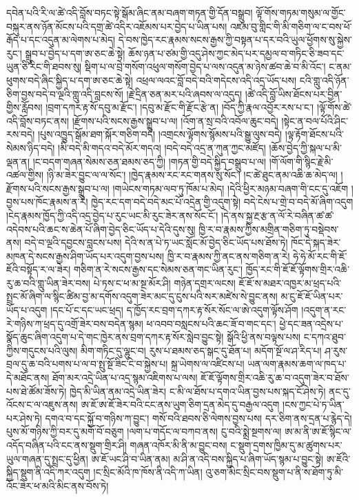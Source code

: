 \documentclass{article}
\begin{document}
དབེན་པའི་རི་ལ་ཚེ་འདི་བློས་བཏང་སྟེ་སྒོམ་ཞིང་ནམ་བཞག་གཏན་གྱི་དོན་བསྒྲུབ། ལྟོ་གོས་གཏམ་གསུམ་ལ་གྱོང་བསྐུར་ནས་ཉོན་མོངས་པའི་དགྲ་ཚེ་འདིར་འཇོམས་པར་བྱེད་པ་ཡིན་པས། འཛམ་བུ་གླིང་གི་མི་གཅིག་ལ་ང་བས་ཕོ་རྒོད་པ་དང་འདུན་མ་ལེགས་པ་མེད། དེ་བས་ཁྱེད་རང་རྣམས་སངས་རྒྱས་ཀྱི་བསྟན་པ་དར་བའི་ཡུལ་ཕྱོགས་སུ་སྐྱེས་རུང་། སྒྲུབ་པ་བྱེད་པ་དག་ཨ་ཅང་ཆེ་སྟེ། ཆོས་ཉན་པ་ཙམ་གྱི་འདུ་ཤེས་ཀྱང་མེད་པར་དམྱལ་བ་གཏིང་ཅི་ཟབ་དང་ཡུན་ཅི་རིང་གི་ཐབས་སུ། སྡིག་པ་ལ་བྲེ་གསོག་འཕུལ་གསོག་བྱེད་པ་ལས་འདུན་མ་ཉེས་ཚབ་ཆེ་བ་མི་འོང་། ང་ནམ་ཕུགས་བདེ་ཞིང་སྐྱིད་པ་དག་ཨ་ཅང་ཆེ་སྟེ། འཕྲལ་ལའང་བློ་བདེ་བའི་གདེངས་འདི་འདྲ་ཡོད་པས། ངའི་གླུ་འདི་ཉོན་ཅིག་བྱས་བདེ་བ་ལྔའི་གླུ་འདི་བླངས་སོ། །རྗེ་དྲིན་ཅན་མར་པའི་ཞབས་ལ་འདུད། །ཚེ་འདི་བློ་ཡིས་ཐོངས་པར་བྱིན་གྱིས་རློབས། །བྲག་དཀར་རྟ་སོ་དབུ་མ་རྫོང་། །དབུ་མ་རྫོང་གི་རྫོང་རྩེ་ན། །བོད་ཀྱི་རྣལ་འབྱོར་རས་པ་ང་། །ལྟོ་གོས་ཚེ་འདི་བློས་བཏང་ནས། །རྫོགས་པའི་སངས་རྒྱས་སྒྲུབ་པ་ལ། །འོག་ན་སྲ་བའི་འབོལ་ཆུང་བདེ། །སྟེང་ན་བལ་པོའི་ཤིང་རས་བདེ། །པུས་འཁྱུད་སྒོམ་ཐག་སྐོར་གཅིག་བདེ། །འགྲངས་ལྟོགས་སྙོམས་པའི་སྒྱུ་ལུས་བདེ། །ལྟ་རྟོག་ཐོངས་པའི་སེམས་ཉིད་བདེ། །མི་བདེ་མི་གདའ་བདེ་མོར་གདའ། །བདེ་བདེ་འདྲ་ན་ཀུན་ཀྱང་མཛོད། །ཆོས་བྱེད་ཀྱི་སྐལ་པ་མི་ལྡན་ན། །ང་བདག་གཞན་སེམས་ཅན་ཐམས་ཅད་ཀྱི། །གཏན་གྱི་བདེ་སྐྱིད་བསྒྲུབ་པ་ལ། །གོ་ལོག་གི་སྙིང་རྗེ་མི་འཚལ་གྱིས། །ཉི་མ་ཟེར་བྱུང་ལ་ལ་སོང་། །ཁྱེད་རྣམས་རང་རང་གནས་སུ་སོང་། །ང་ཚེ་ཐུང་ནམ་འཆི་ཆ་མེད་ལ། །རྫོགས་པའི་སངས་རྒྱས་སྒྲུབ་པ་ལ། །གཡེངས་གཏམ་ལབ་ཏུ་ཁོམ་པ་མེད། །དེའི་ཕྱིར་མཉམ་བཞག་གི་ངང་དུ་འཇོག །བྱས་པས་ཁོང་རྣམས་ན་རེ། ཁྱེད་རང་དག་བདེ་བདེ་མང་པོ་འདྲེན་གྱི་འདུག་སྟེ། བདེ་ངེས་པ་གྲེ་བ་བདེ་མོ་ཞིག་འདུག །ངེད་རྣམས་ཁྱོད་ཀྱི་འདི་འདྲ་བྱེད་པ་རུང་ཡང་མི་རུང་ཟེར་ནས་སོང་ངོ་། །དེ་ནས་སྐྱ་རྔ་རྩ་ན་ལོ་རེ་བཞིན་ཚ་ཚ་འདེབས་པའི་ཆང་ས་ཆེན་པོ་ཞིག་བྱེད་ཅིང་ཡོད་པ་དེའི་དུས་སུ། ཁྱི་ར་བ་རྣམས་ཀྱིས་མགྲིན་གཅིག་ཏུ་བསྡེབས་ནས། བདེ་བ་ལྔའི་དབྱངས་བླངས་པས། དེའི་ས་ན་པེ་ཏ་ཡང་སློང་མོ་བྱེད་ཅིང་ཡོད་པས་ཐོས་ཏེ། ཁོང་དེ་སྐད་ཟེར་མཁན་དེ་སངས་རྒྱས་ཤིག་ཡོད་པར་འདུག་བྱས་པས། ཁྱི་ར་བ་རྣམས་ཀྱི་ནང་ནས་གཅིག་ན་རེ། ཧེ་ཧེ་མོ་རང་གི་ཇོ་ཇོའི་བསྟོད་ར་ལ་ཟེར། གཅིག་ན་རེ་སངས་རྒྱས་དང་སེམས་ཅན་གང་ཡིན་རུང་། ཁྱོད་རང་གི་ཇོ་ཇོ་ལྟོགས་གྲིར་འཆི་རུ་ཆ་བའི་གླུ་ཡིན་ཟེར་བས། པེ་ཏས་ང་ཕ་མ་སྔ་མོར་ཤི། གཉེན་དགྲར་ལངས། ཇོ་ཇོ་ས་མཐར་འཁྱར་མ་ཕྲད་པའི་སྤྲང་མོ་ཞིག་ལ་སྙིང་ཚིམ་བྱ་མ་དགོས་འདུག་ཟེར་མང་དུ་ངུས་པའི་སར་མཛེས་སེ་བྱུང་ནས། མ་ངུ་ཇོ་ཇོ་ཡིན་པར་ཡོད་པ་འདུག །དང་པོ་ང་དང་ཡང་ཕྲད། ད་ཁྱོད་རང་བྲག་དཀར་རྟ་སོར་སོང་ལ་ཨེ་འདུག་ལྟོས་ཤོག །འདུག་ན་རང་རེ་གཉིས་ཀ་ཕྲད་དུ་འགྲོ་ཟེར་བས་བདེན་སྙམ། ཕ་འབབ་བསླངས་པའི་ཆང་ཟོ་བ་གང་དང་། ཕྱེ་དང་ཟན་འདྲེས་པ་སྣོད་ཆུང་ཞིག་འདུག་པ་དེ་གང་ཁྱེར་ནས་བྲག་དཀར་རྟ་སོར་སླེབ་བྱུང་སྟེ། སྒོའི་ཕྱི་ནས་བལྟས་པས། ང་དཀའ་ཐུབ་ཀྱིས་གདུངས་པའི་ལུས། མིག་གཏིང་དུ་ལྷུང་བ། རུས་པ་ཐམས་ཅད་སྒང་དུ་ཐོན་པ། མདོག་སྔོ་ལ་ཤ་རིད་པ། ཤ་རུས་བྲལ་དུ་ཆ་བའི་པགས་པ་ལ་བ་སྤུ་སྔོ་ཟིང་ངེ་བ་སྐྱེས་པ། སྐྲ་ཡེགས་ལ་འཛིངས་པ། ཡན་ལག་རྣམས་ཆག་ལ་ཁད་པ་དེ་མཐོང་ནས། ཐོག་མར་འདྲེ་ཡིན་པ་འདྲ་སྙམ་འཇིགས་པ་ལས། ཇོ་ཇོ་ལྟོགས་གྲིར་འཆི་རུ་ཆ་བ་འདུག་ཟེར་བ་ཐོས་པས་ཐེ་ཚོམ་ཟོས་ཏེ། ཁྱེད་མི་ཡིན་ནམ་འདྲེ་ཡིན་ཟེར། ང་མི་ལ་ཐོས་པ་དགའ་ཡིན་བྱས་པས་སྐད་ངོ་ཤེས་ཏེ། ནང་དུ་འོངས་ང་ལ་འཇུས་ནས། ཨ་ཇོ་ཨ་ཇོ་ཟེར་བའི་ངང་ནས་ཡུག་ཅིག་དྲན་མེད་དུ་བརྒྱལ་འདུག །ངས་ཀྱང་པེ་ཏ་ཡིན་པར་ཤེས་ཏེ། དགའ་བ་དང་སྐྱོ་བ་གཉིས་ཀ་བྱུང་། གསོ་བའི་ཐབས་ཅི་ལེགས་བྱས་པས། དར་ཅིག་ནས་དྲན་པ་རྙེད་དེ། པུས་མོ་གཉིས་ཀྱི་བར་དུ་མགོ་བོ་བཅུག །ལག་པ་གདོང་ལ་བཀབ་ནས། ངུ་བའི་སྨྲེ་སྔགས་ལ། ཨ་མ་ནི་ཨ་ཇོ་སྙིང་ལ་འདོད་བཞིན་པའི་ངང་ནས་སྡུག་གྲིར་ཤི། གཞན་འཁོར་མི་ནི་མ་བྱུང་བས། ང་སྡུག་དྲགས་ཁྱིམ་དུ་མ་ཚུགས་པར་ཡུལ་གཞན་དུ་སྤྲང་དུ་ཕྱིན། ཨ་ཇོ་ཡང་ཤི་བ་ཡིན་ནམ། མ་ཤི་ན་འདི་བས་སྐྱིད་པ་ཞིག་ཡོད་སྙམ་པ་བྱུང་སྟེ། ཨ་ཇོའི་སྐྱིད་སྡུག་ནི་འདི་ཀར་འདུག །ང་སྲིང་མོའི་ཁ་ཁོས་ནི་འདི་ཀ་ཡིན། འུ་ཅག་མིང་སྲིང་བས་སྡུག་པ་ནི་ས་ཐོག་ཏུ་མི་འོང་ཟེར་ཕ་མའི་མིང་ནས་བོས་ཏེ། 
\end{document}
